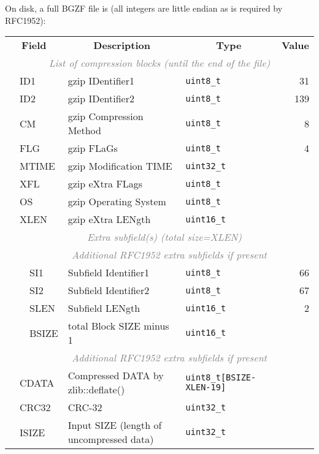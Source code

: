 \documentclass[10pt]{article}
\begin{document}
On disk, a full BGZF file is (all integers are little endian as is
required by RFC1952):
\begin{table}[h]
\centering
{\small
\begin{tabular}{|l|l|l|l|l|r|}
  \cline{1-6}
  \multicolumn{3}{|c|}{\bf Field} & \multicolumn{1}{c|}{\bf Description} & \multicolumn{1}{c|}{\bf Type} & \multicolumn{1}{c|}{\bf Value} \\\cline{1-6}
  \multicolumn{6}{|c|}{\textcolor{gray}{\it List of compression blocks (until the end of the file)}} \\\cline{2-6}
  & \multicolumn{2}{l|}{\sf ID1} & gzip IDentifier1 & {\tt uint8\_t} & 31 \\\cline{2-6}
  & \multicolumn{2}{l|}{\sf ID2} & gzip IDentifier2 & {\tt uint8\_t} & 139 \\\cline{2-6}
  & \multicolumn{2}{l|}{\sf CM} & gzip Compression Method & {\tt uint8\_t} & 8 \\\cline{2-6}
  & \multicolumn{2}{l|}{\sf FLG} & gzip FLaGs & {\tt uint8\_t} & 4 \\\cline{2-6}
  & \multicolumn{2}{l|}{\sf MTIME} & gzip Modification TIME & {\tt uint32\_t} & \\\cline{2-6}
  & \multicolumn{2}{l|}{\sf XFL} & gzip eXtra FLags & {\tt uint8\_t} & \\\cline{2-6}
  & \multicolumn{2}{l|}{\sf OS} & gzip Operating System & {\tt uint8\_t} & \\\cline{2-6}
  & \multicolumn{2}{l|}{\sf XLEN} & gzip eXtra LENgth & {\tt uint16\_t} & \\\cline{2-6}
  & \multicolumn{5}{c|}{\textcolor{gray}{\it Extra subfield(s) (total size=XLEN)}} \\\cline{3-6}
  & & \multicolumn{4}{c|}{\textcolor{gray}{\it Additional RFC1952 extra subfields if present}} \\\cline{3-6}
  & & {\sf SI1} & Subfield Identifier1 & {\tt uint8\_t} & 66 \\\cline{3-6}
  & & {\sf SI2} & Subfield Identifier2 & {\tt uint8\_t} & 67 \\\cline{3-6}
  & & {\sf SLEN} & Subfield LENgth & {\tt uint16\_t} & 2 \\\cline{3-6}
  & & {\sf BSIZE} & total Block SIZE minus 1 & {\tt uint16\_t} & \\\cline{3-6}
  & & \multicolumn{4}{c|}{\textcolor{gray}{\it Additional RFC1952 extra subfields if present}} \\\cline{2-6}
  & \multicolumn{2}{l|}{\sf CDATA} & Compressed DATA by {\sf zlib::deflate()} & {\tt uint8\_t[{\sf BSIZE-XLEN-19}]} & \\\cline{2-6}
  & \multicolumn{2}{l|}{\sf CRC32} & CRC-32 & {\tt uint32\_t} & \\\cline{2-6}
  & \multicolumn{2}{l|}{\sf ISIZE} & Input SIZE (length of uncompressed data) & {\tt uint32\_t} & \\
  \cline{1-6}
\end{tabular}}
\end{table}
\end{document}
